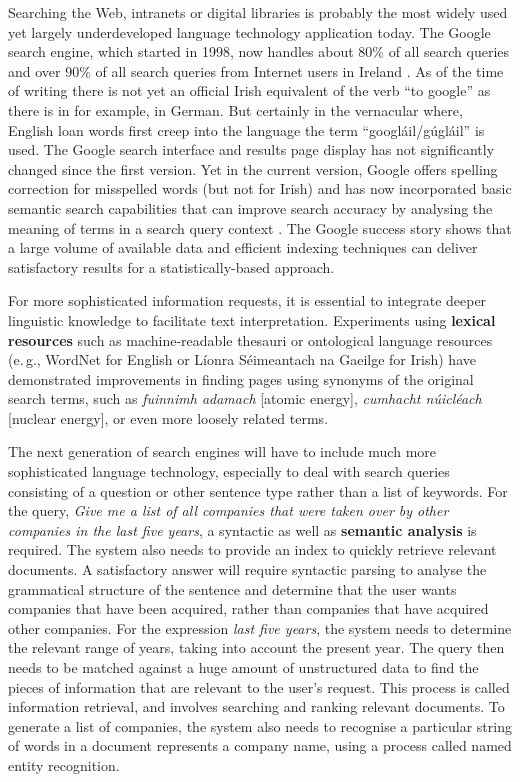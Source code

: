 \begin{multicols}{2}
Searching the Web, intranets or digital libraries is probably the most widely used yet largely underdeveloped language technology application today. The Google search engine, which started in 1998, now handles about 80\% of all search queries and over 90\% of all search queries from Internet users in Ireland \cite{googlemarketshare}. As of the time of writing there is not yet an official Irish equivalent of the verb ``to google'' as there is in for example, in German. But certainly in the vernacular where, English loan words first creep into the language the term ``googláil/gúgláil'' \cite{kilgarriff2010} is used. The Google search interface and results page display has not significantly changed since the first version. Yet in the current version, Google offers spelling correction for misspelled words (but not for Irish) and has now incorporated basic semantic search capabilities that can improve search accuracy by analysing the meaning of terms in a search query context \cite{googlesemsearch}.  The Google success story shows that a large volume of available data and efficient indexing techniques can deliver satisfactory results for a statistically-based approach. 

For more sophisticated information requests, it is essential to integrate deeper linguistic knowledge to facilitate text interpretation. Experiments using \textbf{lexical resources} such as machine-readable thesauri or ontological language resources (e.\,g., WordNet for English or Líonra Séimeantach na Gaeilge for Irish) have demonstrated improvements in finding pages using synonyms of the original search terms, such as \textit{fuinnimh adamach} [atomic energy], \textit{cumhacht núicléach} [nuclear energy], or even more loosely related terms. 

The next generation of search engines will have to include much more sophisticated language technology, especially to deal with search queries consisting of a question or other sentence type rather than a list of keywords. For the query, \textit{Give me a list of all companies that were taken over by other companies in the last five years}, a syntactic as well as \textbf{semantic analysis} is required. The system also needs to provide an index to quickly retrieve relevant documents. A satisfactory answer will require syntactic parsing to analyse the grammatical structure of the sentence and determine that the user wants companies that have been acquired, rather than companies that have acquired other companies. For the expression \textit{last five years}, the system needs to determine the relevant range of years, taking into account the present year. The query then needs to be matched against a huge amount of unstructured data to find the pieces of information that are relevant to the user's request. This process is called information retrieval, and involves searching and ranking relevant documents. To generate a list of companies, the system also needs to recognise a particular string of words in a document represents a company name, using a process called named entity recognition.


\end{multicols}
